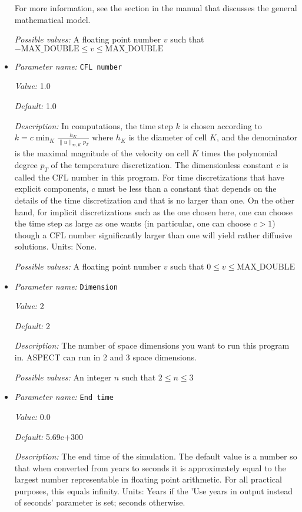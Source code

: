 \begin{itemize}
For more information, see the section in the manual that discusses the general mathematical model.


{\it Possible values:} A floating point number $v$ such that $-\text{MAX\_DOUBLE} \leq v \leq \text{MAX\_DOUBLE}$
\item {\it Parameter name:} {\tt CFL number}
\label{parameters:CFL number}


{\it Value:} 1.0


{\it Default:} 1.0


{\it Description:} In computations, the time step $k$ is chosen according to $k = c \min_K \frac {h_K} {\|u\|_{\infty,K} p_T}$ where $h_K$ is the diameter of cell $K$, and the denominator is the maximal magnitude of the velocity on cell $K$ times the polynomial degree $p_T$ of the temperature discretization. The dimensionless constant $c$ is called the CFL number in this program. For time discretizations that have explicit components, $c$ must be less than a constant that depends on the details of the time discretization and that is no larger than one. On the other hand, for implicit discretizations such as the one chosen here, one can choose the time step as large as one wants (in particular, one can choose $c>1$) though a CFL number significantly larger than one will yield rather diffusive solutions. Units: None.


{\it Possible values:} A floating point number $v$ such that $0 \leq v \leq \text{MAX\_DOUBLE}$
\item {\it Parameter name:} {\tt Dimension}
\label{parameters:Dimension}


{\it Value:} 2


{\it Default:} 2


{\it Description:} The number of space dimensions you want to run this program in. ASPECT can run in 2 and 3 space dimensions.


{\it Possible values:} An integer $n$ such that $2\leq n \leq 3$
\item {\it Parameter name:} {\tt End time}
\label{parameters:End time}


{\it Value:} 0.0


{\it Default:} 5.69e+300


{\it Description:} The end time of the simulation. The default value is a number so that when converted from years to seconds it is approximately equal to the largest number representable in floating point arithmetic. For all practical purposes, this equals infinity. Units: Years if the 'Use years in output instead of seconds' parameter is set; seconds otherwise.



\end{itemize}
